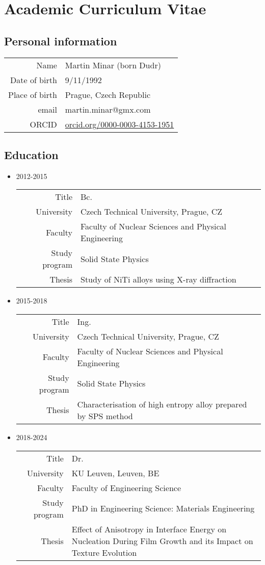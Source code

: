 \chapter*{Academic Curriculum Vitae}\label{ch:curriculum}
\section*{Personal information}

	\begin{tabular}{rl}
		Name           & Martin Minar (born Dudr) \\
		Date of birth  & 9/11/1992                \\
		Place of birth & Prague, Czech Republic   \\
		email          & martin.minar@gmx.com    \\
		ORCID 		    & \url{orcid.org/0000-0003-4153-1951}
	\end{tabular}


\section*{Education}
\begin{itemize}
	\item 2012-2015\\
		\begin{tabular}{rp{8cm}}
			Title & Bc. \\
			University           & Czech Technical University, Prague, CZ \\
			Faculty  & Faculty of Nuclear Sciences and Physical Engineering\\
			Study program  & Solid State Physics\\
			Thesis          & Study of NiTi alloys using X-ray diffraction  
		\end{tabular}
	\item 2015-2018 \\
		\begin{tabular}{rp{8cm}}
			Title & Ing. \\
			University           & Czech Technical University, Prague, CZ \\
			Faculty  & Faculty of Nuclear Sciences and Physical Engineering\\
			Study program  & Solid State Physics\\
			Thesis          & Characterisation of high entropy alloy prepared by SPS method
		\end{tabular}
	\item 2018-2024 \\
		\begin{tabular}{rp{8cm}}
			Title & Dr. \\
			University           & KU Leuven, Leuven, BE \\
			Faculty  & Faculty of Engineering Science\\
			Study program  & PhD in Engineering Science: Materials Engineering\\
			Thesis          & Effect of Anisotropy in Interface Energy on Nucleation During Film Growth and its Impact on Texture Evolution
		\end{tabular}
\end{itemize}

